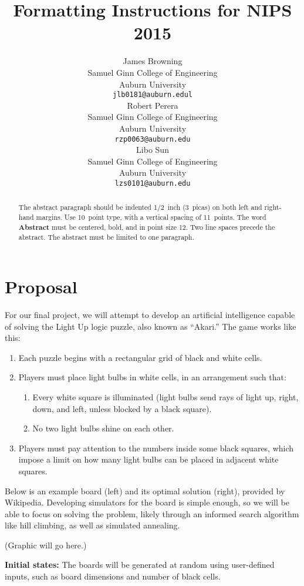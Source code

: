 \documentclass{article} %
\title{Formatting Instructions for NIPS 2015}
\author{
James Browning \\
Samuel Ginn College of Engineering \\
Auburn University \\
\texttt{jlb0181@auburn.edul} \\
\And
Robert Perera \\
Samuel Ginn College of Engineering \\
Auburn University \\
\texttt{rzp0063@auburn.edu} \\
\And
Libo Sun \\
Samuel Ginn College of Engineering \\
Auburn University \\
\texttt{lzs0101@auburn.edu} \\
}
\begin{document}
\maketitle

\begin{abstract}
The abstract paragraph should be indented 1/2~inch (3~picas) on both left and
right-hand margins. Use 10~point type, with a vertical spacing of 11~points.
The word \textbf{Abstract} must be centered, bold, and in point size 12. Two
line spaces precede the abstract. The abstract must be limited to one
paragraph.
\end{abstract}

\section{Proposal}

For our final project, we will attempt to develop an artificial intelligence capable of solving the Light Up logic puzzle, also known as “Akari.” The game works like this:

\begin{enumerate}
\item Each puzzle begins with a rectangular grid of black and white cells.
\item Players must place light bulbs in white cells, in an arrangement such that:
\begin{enumerate}
\item Every white square is illuminated (light bulbs send rays of light up, right, down, and left, unless blocked by a black square).
\item No two light bulbs shine on each other.
\end{enumerate}
\item Players must pay attention to the numbers inside some black squares, which impose a limit on how many light bulbs can be placed in adjacent white squares.
\end{enumerate}

Below is an example board (left) and its optimal solution (right), provided by Wikipedia. Developing simulators for the board is simple enough, so we will be able to focus on solving the problem, likely through an informed search algorithm like hill climbing, as well as simulated annealing.

(Graphic will go here.)

\textbf{Initial states:} The boards will be generated at random using user-defined inputs, such as board dimensions and number of black cells.
\end{document}
